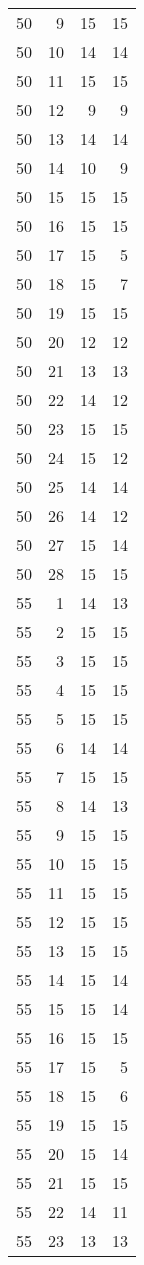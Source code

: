 \documentclass[
]{article}
\begin{document}
\begin{longtable}[]{@{}rrrr@{}}
50 & 9 & 15 & 15 \\
50 & 10 & 14 & 14 \\
50 & 11 & 15 & 15 \\
50 & 12 & 9 & 9 \\
50 & 13 & 14 & 14 \\
50 & 14 & 10 & 9 \\
50 & 15 & 15 & 15 \\
50 & 16 & 15 & 15 \\
50 & 17 & 15 & 5 \\
50 & 18 & 15 & 7 \\
50 & 19 & 15 & 15 \\
50 & 20 & 12 & 12 \\
50 & 21 & 13 & 13 \\
50 & 22 & 14 & 12 \\
50 & 23 & 15 & 15 \\
50 & 24 & 15 & 12 \\
50 & 25 & 14 & 14 \\
50 & 26 & 14 & 12 \\
50 & 27 & 15 & 14 \\
50 & 28 & 15 & 15 \\
55 & 1 & 14 & 13 \\
55 & 2 & 15 & 15 \\
55 & 3 & 15 & 15 \\
55 & 4 & 15 & 15 \\
55 & 5 & 15 & 15 \\
55 & 6 & 14 & 14 \\
55 & 7 & 15 & 15 \\
55 & 8 & 14 & 13 \\
55 & 9 & 15 & 15 \\
55 & 10 & 15 & 15 \\
55 & 11 & 15 & 15 \\
55 & 12 & 15 & 15 \\
55 & 13 & 15 & 15 \\
55 & 14 & 15 & 14 \\
55 & 15 & 15 & 14 \\
55 & 16 & 15 & 15 \\
55 & 17 & 15 & 5 \\
55 & 18 & 15 & 6 \\
55 & 19 & 15 & 15 \\
55 & 20 & 15 & 14 \\
55 & 21 & 15 & 15 \\
55 & 22 & 14 & 11 \\
55 & 23 & 13 & 13 \\

\end{longtable}
\end{document}

